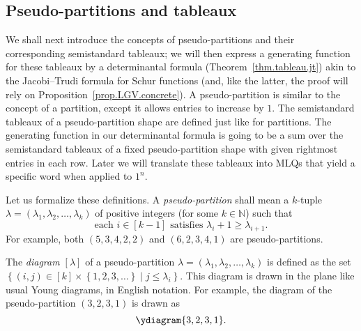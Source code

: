 \documentclass[reqno]{amsart}
\newcommand{\0}{\phantom{c}}
\newcommand{\diag}[1]{\left[#1\right]} %
\newcommand{\NN}{\mathbb{N}}
\newenvironment{verlong}{}{}
\newcommand{\set}[1]{\left\{ #1 \right\}}
\newcommand{\tup}[1]{\left( #1 \right)}
\newcommand{\ive}[1]{\left[ #1 \right]}
\newcommand{\defn}[1]{{\color{darkred}\emph{#1}}} %
\theoremstyle{plain}
\theoremstyle{definition}
\numberwithin{equation}{section}
\begin{document}
\subsection{Pseudo-partitions and tableaux}

We shall next introduce the concepts of pseudo-partitions and their corresponding semistandard tableaux;
we will then express a generating function for these tableaux by a determinantal formula (Theorem~\ref{thm.tableau.jt}) akin to the Jacobi--Trudi formula for Schur functions (and, like the latter, the proof will rely on Proposition~\ref{prop.LGV.concrete}).
A pseudo-partition is similar to the concept of a partition, except it allows entries to increase by $1$.
The semistandard tableaux of a pseudo-partition shape are defined just like for partitions.
The generating function in our determinantal formula is going to be a sum over the semistandard tableaux of a fixed pseudo-partition shape with given rightmost entries in each row.
Later we will translate these tableaux into MLQs that yield a specific word when applied to $1^n$.

Let us formalize these definitions.
A \defn{pseudo-partition} shall mean a $k$-tuple $\lambda = \tup{\lambda_1, \lambda_2, \dotsc, \lambda_k}$ of positive integers (for some $k \in \NN$) such that
\[
\text{each } i \in \ive{k-1} \text{ satisfies } \lambda_i + 1 \geq \lambda_{i+1}.
\]
For example, both $\tup{5,3,4,2,2}$ and $\tup{6,2,3,4,1}$ are pseudo-partitions.

The \defn{diagram $\diag{\lambda}$} of a pseudo-partition $\lambda = \tup{\lambda_1, \lambda_2, \dotsc,\lambda_k}$ is defined as the set
$\set{  \left(  i,j\right)  \in \ive{k} \times \set{ 1,2,3,\ldots }  \mid  j \leq \lambda_i }$.
This diagram is drawn in the plane like usual Young diagrams, in English notation.
\begin{verlong}
For example, the diagram of the pseudo-partition $\tup{3,2,3,1}$ is drawn as
\[
\ydiagram{3,2,3,1}.
\]
\end{verlong}
\end{document}
